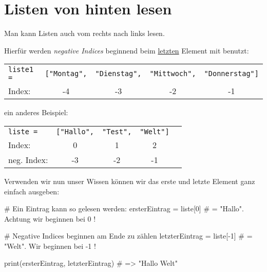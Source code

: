 \documentclass{\VorlagenPfad/coderdojokatext}
\begin{document}
\section{Listen von hinten lesen}
Man kann Listen auch vom rechts nach links lesen. 

Hierfür werden \textit{negative Indices} beginnend beim \underline{letzten} Element mit \code{[-1]} benutzt:

\begin{table}[width=\textwidth]
	\begin{tabular}{lllll}
		\texttt{liste1 =} &	\texttt{["Montag",} & \texttt{"Dienstag",} & \texttt{"Mittwoch",} & \texttt{"Donnerstag"]}               \\
		
		Index:  & \multicolumn{1}{c}{-4} & \multicolumn{1}{c}{-3} & \multicolumn{1}{c}{-2} & \multicolumn{1}{c}{-1} \\
		\end{tabular}
\end{table}

ein anderes Beispiel:

\begin{table}[width=\textwidth]
	\begin{tabular}{lllll}
		\texttt{liste =} &
		\texttt{["Hallo",}  & \texttt{"Test",} & \texttt{"Welt"]}  \\
		
		Index:  & \multicolumn{1}{c}{0} & \multicolumn{1}{c}{1} & \multicolumn{1}{c}{2} \\          
		neg. Index:  & \multicolumn{1}{c}{-3} & \multicolumn{1}{c}{-2} & \multicolumn{1}{c}{-1} \\
	\end{tabular}
\end{table}

Verwenden wir nun unser Wissen können wir das erste und letzte Element ganz einfach ausgeben:
\begin{pythoncode}
# Ein Eintrag kann so gelesen werden:
ersterEintrag = liste[0] # = "Hallo". Achtung wir beginnen bei 0 !

# Negative Indices beginnen am Ende zu zählen
letzterEintrag = liste[-1] # = "Welt". Wir beginnen bei -1 !

print(ersterEintrag, letzterEintrag) # => "Hallo Welt"
\end{pythoncode}
\end{document}

